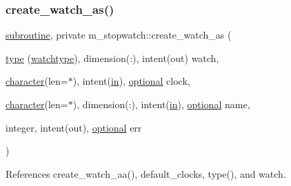 \subsubsection{\texorpdfstring{create\+\_\+watch\+\_\+as()}{create\_watch\_as()}}
{\footnotesize\ttfamily \hyperlink{M__stopwatch_83_8txt_acfbcff50169d691ff02d4a123ed70482}{subroutine}, private m\+\_\+stopwatch\+::create\+\_\+watch\+\_\+as (\begin{DoxyParamCaption}\item[{\hyperlink{stop__watch_83_8txt_a70f0ead91c32e25323c03265aa302c1c}{type} (\hyperlink{structm__stopwatch_1_1watchtype}{watchtype}), dimension(\+:), intent(out)}]{watch,  }\item[{\hyperlink{option__stopwatch_83_8txt_abd4b21fbbd175834027b5224bfe97e66}{character}(len=$\ast$), intent(\hyperlink{M__journal_83_8txt_afce72651d1eed785a2132bee863b2f38}{in}), \hyperlink{option__stopwatch_83_8txt_aa4ece75e7acf58a4843f70fe18c3ade5}{optional}}]{clock,  }\item[{\hyperlink{option__stopwatch_83_8txt_abd4b21fbbd175834027b5224bfe97e66}{character}(len=$\ast$), dimension(\+:), intent(\hyperlink{M__journal_83_8txt_afce72651d1eed785a2132bee863b2f38}{in}), \hyperlink{option__stopwatch_83_8txt_aa4ece75e7acf58a4843f70fe18c3ade5}{optional}}]{name,  }\item[{integer, intent(out), \hyperlink{option__stopwatch_83_8txt_aa4ece75e7acf58a4843f70fe18c3ade5}{optional}}]{err }\end{DoxyParamCaption})\hspace{0.3cm}{\ttfamily [private]}}



References create\+\_\+watch\+\_\+aa(), default\+\_\+clocks, type(), and watch.

\mbox{\label{namespacem__stopwatch_aee0f1d95fc46e6d8008b931e0ec60075}} 
